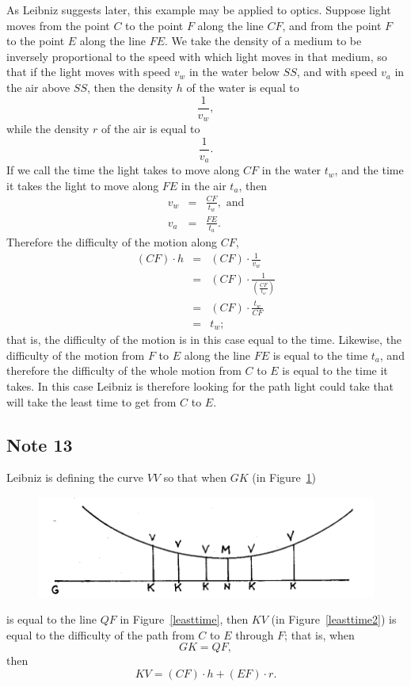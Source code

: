 \documentclass[polutonikogreek,english,twoside,openright]{article}
\newlength{\oldjot}
\begin{document}
As Leibniz suggests later, this example may be applied to optics.
Suppose light moves from the point $C$ to the point $F$ along the line
$CF$, and from the point $F$ to the point $E$ along the line $FE$.  We
take the density of a medium to be inversely proportional to the speed
with which light moves in that medium, so that if the light moves with
speed $v_w$ in the water below $SS$, and with speed $v_a$ in the air
above $SS$, then the density $h$ of the water is equal to
$$\frac{1}{v_w},$$
while the density $r$ of the air is equal to 
$$\frac{1}{v_a}.$$
If we call the time the light takes to move along $CF$ in the water
$t_w$, and the time it takes the light to move along $FE$ in the air
$t_a$, then
\begin{eqnarray*}
v_w & = & \frac{CF}{t_w}, \mbox{ and}\\
v_a & = & \frac{FE}{t_a}.
\end{eqnarray*}
Therefore the difficulty of the motion along $CF$, 
\setlength{\jot}{2ex}
\begin{eqnarray*}
(CF)\cdot h &  =  & (CF) \cdot \frac{1}{v_w}\\
& = & (CF) \cdot \frac{1}{\left(\frac{CF}{t_w}\right)}\\
& = & (CF) \cdot \frac{t_w}{CF} \\
& = & t_w;
\end{eqnarray*}
that is, the difficulty of the motion is in this case equal to the
time.  Likewise, the difficulty of the motion from $F$ to $E$ along
the line $FE$ is equal to the time $t_a$, and therefore the difficulty
of the whole motion from $C$ to $E$ is equal to the time it takes.  In
this case Leibniz is therefore looking for the path light could take
that will take the least time to get from $C$ to $E$.
\setlength{\jot}{\oldjot}

\subsection*{Note 13}
\label{cnm13}

Leibniz is defining the curve $VV$ so that when $GK$ (in Figure~\ref{leasttime2A})
\begin{figure}[htp]
\begin{center}
\includegraphics[width=.95\textwidth]{fig/Figure22}
\caption{}
\label{leasttime2A}
\vspace{-10pt}
\end{center}
\end{figure}
is equal to the line $QF$ in Figure~\ref{leasttime}, then $KV$ (in
Figure~\ref{leasttime2}) is equal to the difficulty of the path from
$C$ to $E$ through $F$; that is, when
$$GK = QF,$$
then 
$$KV =  (CF)\cdot h + (EF)\cdot r.$$
\end{document}
